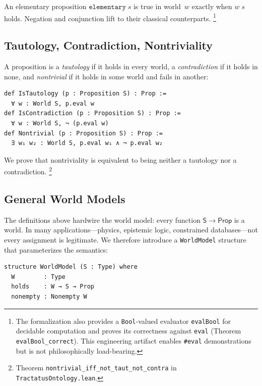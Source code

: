 \documentclass[jsl,bibother]{asl}
\theoremstyle{definition}
\theoremstyle{remark}
\newcommand{\Sach}{\mathsf{S}}
\newcommand{\Prop}{\mathsf{Prop}}
\begin{document}
\noindent
An elementary proposition $\mathtt{elementary}\;s$ is true in
world~$w$ exactly when $w\;s$ holds.  Negation and conjunction
lift to their classical counterparts.%
\footnote{The formalization also provides a
\texttt{Bool}-valued evaluator \texttt{evalBool} for decidable
computation and proves its correctness against
\texttt{eval} (Theorem \texttt{evalBool\_correct}).
This engineering artifact enables \texttt{\#eval} demonstrations
but is not philosophically load-bearing.}

\subsection{Tautology, Contradiction, Nontriviality}
\label{sec:tautology}

A proposition is a \emph{tautology} if it holds in every world,
a \emph{contradiction} if it holds in none, and
\emph{nontrivial} if it holds in some world and fails in
another:

\begin{lstlisting}
def IsTautology (p : Proposition S) : Prop :=
  ∀ w : World S, p.eval w
def IsContradiction (p : Proposition S) : Prop :=
  ∀ w : World S, ¬ (p.eval w)
def Nontrivial (p : Proposition S) : Prop :=
  ∃ w₁ w₂ : World S, p.eval w₁ ∧ ¬ p.eval w₂
\end{lstlisting}

\noindent
We prove that nontriviality is equivalent to being neither a
tautology nor a contradiction.%
\footnote{Theorem \texttt{nontrivial\_iff\_not\_taut\_not\_contra}
  in \texttt{TractatusOntology.lean}.}

\subsection{General World Models}
\label{sec:worldmodel}

The definitions above hardwire the world model: every
function $\Sach \to \Prop$ is a world.  In many
applications---physics, epistemic logic, constrained
databases---not every assignment is legitimate.
We therefore introduce a \texttt{WorldModel} structure
that parameterizes the semantics:

\begin{lstlisting}
structure WorldModel (S : Type) where
  W        : Type
  holds    : W → S → Prop
  nonempty : Nonempty W
\end{lstlisting}
\end{document}
